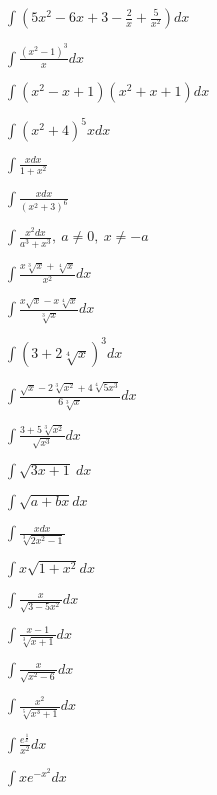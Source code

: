 

\begin{multicols}{2}
$\displaystyle \int \left(5x^2-6x+3-\frac{2}{x}+\frac{5}{x^2}\right)dx$

$\displaystyle \int \frac{(x^2-1)^3}{x}dx$

$\displaystyle \int (x^2-x+1)(x^2+x+1)dx$

$\displaystyle \int (x^2+4)^5xdx$

$\displaystyle \int \frac{xdx}{1+x^2}$

$\displaystyle \int \frac{xdx}{(x^2+3)^6}$

$\displaystyle \int \frac{x^2dx}{a^3+x^3}, \ a\neq 0, \ x\neq -a$

$\displaystyle \int \frac{x\sqrt[3]{x}+\sqrt[4]{x}}{x^2}dx$

$\displaystyle \int \frac{x\sqrt{x}-x\sqrt[4]{x}}{\sqrt[3]{x}}dx$

$\displaystyle \int (3+2\sqrt[4]{x})^3dx$

$\displaystyle \int \frac{\sqrt{x}-2\sqrt[3]{x^2}+4\sqrt[4]{5x^3}}{6\sqrt[3]{x}}dx$

$\displaystyle \int \frac{3+5\sqrt[3]{x^2}}{\sqrt{x^3}}dx$

$\displaystyle \int \sqrt{3x+1}\ dx$

$\displaystyle \int \sqrt{a+bx}dx$

$\displaystyle \int \frac{xdx}{\sqrt[3]{2x^2-1}}$

$\displaystyle \int x\sqrt{1+x^2}dx$

$\displaystyle \int \frac{x}{\sqrt{3-5x^2}}dx$

$\displaystyle \int \frac{x-1}{\sqrt[3]{x+1}}dx$

$\displaystyle \int \frac{x}{\sqrt{x^2-6}}dx$

$\displaystyle \int \frac{x^2}{\sqrt[5]{x^3+1}}dx$

$\displaystyle \int \frac{e^{\frac{1}{x}}}{x^2}dx$

$\displaystyle \int xe^{-x^2}dx$


\end{multicols}

